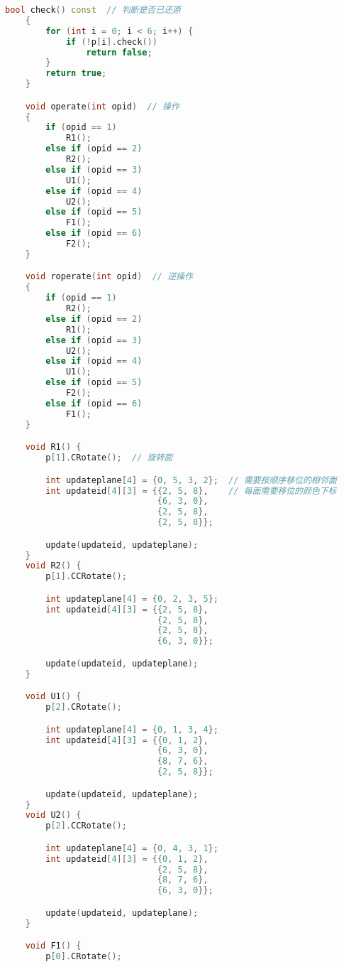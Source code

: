 \begin{lstlisting}[language=C++]
    bool check() const  // 判断是否已还原
    {
        for (int i = 0; i < 6; i++) {
            if (!p[i].check())
                return false;
        }
        return true;
    }

    void operate(int opid)  // 操作
    {
        if (opid == 1)
            R1();
        else if (opid == 2)
            R2();
        else if (opid == 3)
            U1();
        else if (opid == 4)
            U2();
        else if (opid == 5)
            F1();
        else if (opid == 6)
            F2();
    }

    void roperate(int opid)  // 逆操作
    {
        if (opid == 1)
            R2();
        else if (opid == 2)
            R1();
        else if (opid == 3)
            U2();
        else if (opid == 4)
            U1();
        else if (opid == 5)
            F2();
        else if (opid == 6)
            F1();
    }

    void R1() {
        p[1].CRotate();  // 旋转面

        int updateplane[4] = {0, 5, 3, 2};  // 需要按顺序移位的相邻面
        int updateid[4][3] = {{2, 5, 8},    // 每面需要移位的颜色下标
                              {6, 3, 0},
                              {2, 5, 8},
                              {2, 5, 8}};

        update(updateid, updateplane);
    }
    void R2() {
        p[1].CCRotate();

        int updateplane[4] = {0, 2, 3, 5};
        int updateid[4][3] = {{2, 5, 8},
                              {2, 5, 8},
                              {2, 5, 8},
                              {6, 3, 0}};

        update(updateid, updateplane);
    }

    void U1() {
        p[2].CRotate();

        int updateplane[4] = {0, 1, 3, 4};
        int updateid[4][3] = {{0, 1, 2},
                              {6, 3, 0},
                              {8, 7, 6},
                              {2, 5, 8}};

        update(updateid, updateplane);
    }
    void U2() {
        p[2].CCRotate();

        int updateplane[4] = {0, 4, 3, 1};
        int updateid[4][3] = {{0, 1, 2},
                              {2, 5, 8},
                              {8, 7, 6},
                              {6, 3, 0}};

        update(updateid, updateplane);
    }

    void F1() {
        p[0].CRotate();


\end{lstlisting}
